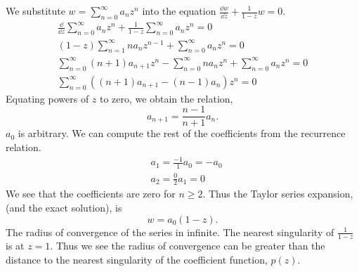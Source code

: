 \begin{Solution} 
  \label{solution dwdz + 1 1-z w}
  We substitute $w = \sum_{n=0}^\infty a_n z^n$ into the equation 
  $\frac{\dd w}{\dd z} + \frac{1}{1-z} w = 0$.
  \begin{gather*}
    \frac{\dd}{\dd z} \sum_{n=0}^\infty a_n z^n 
    + \frac{1}{1-z}\sum_{n=0}^\infty a_n z^n = 0 \\
    (1-z)\sum_{n=1}^\infty n a_n z^{n-1} + \sum_{n=0}^\infty a_n z^n = 0 \\
    \sum_{n=0}^\infty (n+1) a_{n+1} z^n - \sum_{n=0}^\infty n a_n z^n
    + \sum_{n=0}^\infty a_n z^n = 0 \\
    \sum_{n=0}^\infty \left( (n+1) a_{n+1} - (n-1) a_n \right) z^n = 0
  \end{gather*}
  Equating powers of $z$ to zero, we obtain the relation,
  \[
  a_{n+1} = \frac{n-1}{n+1} a_n.
  \]
  $a_0$ is arbitrary.  We can compute the rest of the coefficients from the 
  recurrence relation.
  \begin{align*}
    &a_1 = \frac{-1}{1} a_0 = -a_0 \\
    &a_2 = \frac{0}{2} a_1 = 0
  \end{align*}
  We see that the coefficients are zero for $n \geq 2$. Thus the Taylor
  series expansion, (and the exact solution),  is
  \[ 
  \boxed{
    w = a_0(1-z).
    } 
  \]
  The radius of convergence of the series in infinite.  The nearest singularity
  of $\frac{1}{1-z}$ is at $z=1$.  Thus we see the radius of convergence can
  be greater than the distance to the nearest singularity of the coefficient 
  function, $p(z)$.
\end{Solution}








